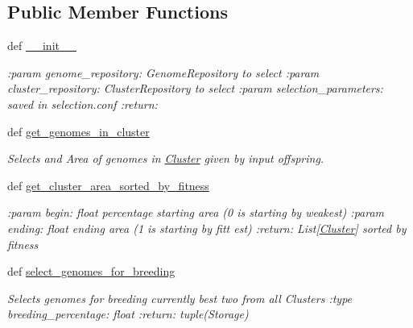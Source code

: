 \subsection*{Public Member Functions}
\begin{DoxyCompactItemize}
\item 
def \hyperlink{classNEAT__PyGenetics_1_1NEAT_1_1Analyst_1_1GenomeSelector_1_1GenomeSelector_a92cb92afdabf4246963cf8214c9baa76}{\+\_\+\+\_\+init\+\_\+\+\_\+}
\begin{DoxyCompactList}\small\item\em \+:param genome\+\_\+repository\+: Genome\+Repository to select \+:param cluster\+\_\+repository\+: Cluster\+Repository to select \+:param selection\+\_\+parameters\+: saved in selection.\+conf \+:return\+: \end{DoxyCompactList}\item 
def \hyperlink{classNEAT__PyGenetics_1_1NEAT_1_1Analyst_1_1GenomeSelector_1_1GenomeSelector_aae7092166920c907176530a60deda37d}{get\+\_\+genomes\+\_\+in\+\_\+cluster}
\begin{DoxyCompactList}\small\item\em Selects and Area of genomes in \hyperlink{namespaceNEAT__PyGenetics_1_1NEAT_1_1Analyst_1_1Cluster}{Cluster} given by input offspring. \end{DoxyCompactList}\item 
def \hyperlink{classNEAT__PyGenetics_1_1NEAT_1_1Analyst_1_1GenomeSelector_1_1GenomeSelector_a2fb8600454d9d808158dbe3ace6b4952}{get\+\_\+cluster\+\_\+area\+\_\+sorted\+\_\+by\+\_\+fitness}
\begin{DoxyCompactList}\small\item\em \+:param begin\+: float percentage starting area (0 is starting by weakest) \+:param ending\+: float ending area (1 is starting by fitt est) \+:return\+: List\mbox{[}\hyperlink{namespaceNEAT__PyGenetics_1_1NEAT_1_1Analyst_1_1Cluster}{Cluster}\mbox{]} sorted by fitness \end{DoxyCompactList}\item 
def \hyperlink{classNEAT__PyGenetics_1_1NEAT_1_1Analyst_1_1GenomeSelector_1_1GenomeSelector_a938d385b8d73983a5e9abf75a80f03f5}{select\+\_\+genomes\+\_\+for\+\_\+breeding}
\begin{DoxyCompactList}\small\item\em Selects genomes for breeding currently best two from all Clusters \+:type breeding\+\_\+percentage\+: float \+:return\+: tuple(\+Storage) \end{DoxyCompactList}\item 

\end{DoxyCompactItemize}
